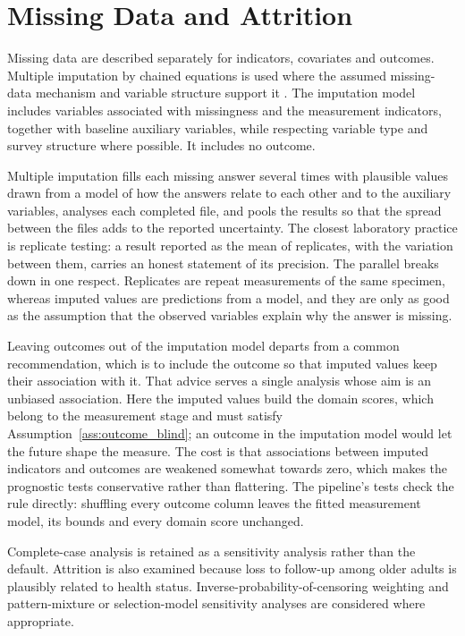 \section{Missing Data and Attrition}
\label{sec:missing}

Missing data are described separately for indicators, covariates and outcomes. Multiple imputation by chained equations is used where the assumed missing-data mechanism and variable structure support it \citep{rubin_1987,vanbuuren_2011}. The imputation model includes variables associated with missingness and the measurement indicators, together with baseline auxiliary variables, while respecting variable type and survey structure where possible. It includes no outcome.

Multiple imputation fills each missing answer several times with plausible values drawn from a model of how the answers relate to each other and to the auxiliary variables, analyses each completed file, and pools the results so that the spread between the files adds to the reported uncertainty. The closest laboratory practice is replicate testing: a result reported as the mean of replicates, with the variation between them, carries an honest statement of its precision. The parallel breaks down in one respect. Replicates are repeat measurements of the same specimen, whereas imputed values are predictions from a model, and they are only as good as the assumption that the observed variables explain why the answer is missing.

Leaving outcomes out of the imputation model departs from a common recommendation, which is to include the outcome so that imputed values keep their association with it. That advice serves a single analysis whose aim is an unbiased association. Here the imputed values build the domain scores, which belong to the measurement stage and must satisfy Assumption~\ref{ass:outcome_blind}; an outcome in the imputation model would let the future shape the measure. The cost is that associations between imputed indicators and outcomes are weakened somewhat towards zero, which makes the prognostic tests conservative rather than flattering. The pipeline's tests check the rule directly: shuffling every outcome column leaves the fitted measurement model, its bounds and every domain score unchanged.

Complete-case analysis is retained as a sensitivity analysis rather than the default. Attrition is also examined because loss to follow-up among older adults is plausibly related to health status. Inverse-probability-of-censoring weighting and pattern-mixture or selection-model sensitivity analyses are considered where appropriate.

